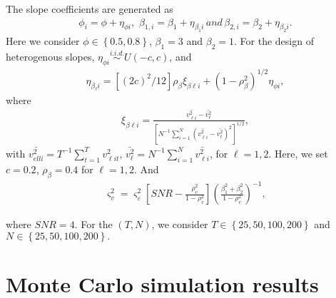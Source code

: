 \documentclass[12pt,a4paper,hyperref]{article}
\begin{document}
The slope coefficients are generated as
\begin{align}
\phi_{i}=\phi+\eta_{\phi i},\,\, \beta_{1,i}=\beta_{1}+\eta_{\beta_{1} i}\, and\, \beta_{2,i}=\beta_{2}+\eta_{\beta_{2}i}.
\end{align}
Here we consider $\phi \in \left\{0.5, 0.8 \right\}$, $\beta_{1}=3$ and $\beta_{2}=1$. For the design of heterogenous slopes, $\eta_{\phi i} \overset{i.i.d.}{\sim} U\left( -c, c\right)$, and
\begin{align}
\eta_{\beta_{\ell}i}=\left[(2c)^{2}/12 \right]\rho_{\beta}\xi_{\beta \ell i}+ \left(1-\rho^{2}_{\beta}  \right)^{1/2}\eta_{\phi i},
\end{align}
where
\begin{align}
\xi_{\beta \ell i}=\frac{\bar{v^{2}_{\ell i}}- \bar{v^{2}_{\ell}}}{\left[ N^{-1}\sum^{N}_{i=1} \left( \bar{v^{2}_{\ell i}}- \bar{v^{2}_{\ell }}\right)^{2} \right]^{1/2} },
\end{align}
with $\bar{v^{2}_{ell i}}=T^{-1}\sum^{T}_{t=1}v^{2}_{\ell i t}$, $\bar{v^{2}_{\ell}}=N^{-1} \sum^{N}_{i=1} \bar{v^{2}_{\ell i}}$, for $\ell=1,2.$
Here, we set $c=0.2,\, \rho_{\beta}=0.4$ for $\ell=1,2.$ And 
\begin{align}
\varsigma^{2}_{v}=\varsigma^{2}_{\varepsilon}\left[SNR-\frac{\rho^{2}_{v}}{1-\rho^{2}_{v}}   \right]\left(\frac{\beta^{2}_{1}+\beta^{2}_{2}}{1-\rho^{2}_{v}}  \right)^{-1},
\end{align} 

where $SNR=4$. For the $(T,N)$, we consider $T \in \left\{25, 50, 100, 200  \right\}$ and  $N \in \left\{25, 50, 100, 200  \right\}.$




\section{Monte Carlo simulation results}





































\newpage

\renewcommand\refname{References}


\end{document}
